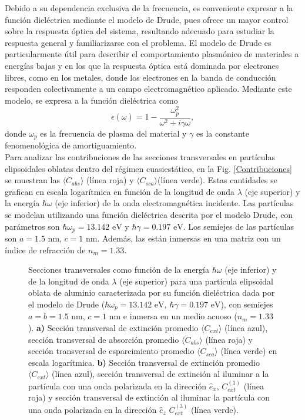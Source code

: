 Debido a su dependencia exclusiva de la frecuencia, es conveniente expresar a la función dieléctrica mediante el modelo de Drude, pues ofrece un mayor control sobre la respuesta óptica del sistema, resultando adecuado para estudiar la respuesta general y familiarizarse con el problema. El modelo de Drude es particularmente útil para describir el comportamiento plasmónico de materiales a energías bajas y en los que la respuesta óptica está dominada por electrones libres, como en los metales, donde los electrones en la banda de conducción responden colectivamente a un campo electromagnético aplicado. Mediante este modelo, se expresa a la función dieléctrica como \cite{Plasmonics}
\begin{equation} \epsilon(\omega) = 1 - \frac{\omega_p^2}{\omega^2 + i\gamma\omega}, \end{equation}
donde $\omega_p$ es la frecuencia de plasma del material y $\gamma$ es la constante fenomenológica de amortiguamiento. \\

Para analizar las contribuciones de las secciones transversales en partículas elipsoidales oblatas dentro del régimen cuasiestático, en la Fig. \ref{Contribuciones} se muestran las $\langle C_{abs} \rangle$ (línea roja) y $\langle C_{sca} \rangle$(línea verde). Estas cantidades se grafican en escala logarítmica en función de la longitud de onda $\lambda$ (eje superior) y la energía $\hbar\omega$ (eje inferior) de la onda electromagnética incidente. Las partículas se modelan utilizando una función dieléctrica descrita por el modelo Drude, con parámetros son $\hbar\omega_p=13.142\text{ eV}$ y $\hbar\gamma=0.197\text{ eV}$. Los semiejes de las partículas son $a=1.5\text{ nm}$, $c=1\text{ nm}$. Además, las están inmersas en una matriz con un índice de refracción de $n_m=1.33$. \\
\begin{figure}[h!]
	\quad%
	\caption{Secciones transversales como función de la energía $\hbar\omega$ (eje inferior) y de la longitud de onda $\lambda$ (eje superior) para una partícula elipsoidal oblata de aluminio caracterizada por su función dieléctrica dada por el modelo de Drude ($\hbar\omega_p=13.142\text{ eV}$, $\hbar\gamma=0.197\text{ eV}$), con semiejes $a=b=1.5\text{ nm}$, $c=1\text{ nm}$ e inmersa en un medio acuoso ($n_m=1.33$). \textbf{a)}  Sección transversal de extinción promedio $\langle C_{ext}\rangle$  (línea azul), sección transversal de absorción promedio $\langle C_{abs}\rangle$  (línea roja) y sección transversal de esparcimiento promedio $\langle C_{sca}\rangle$  (línea verde) en escala logarítmica. \textbf{b)} Sección transversal de extinción promedio $\langle C_{ext}\rangle$ (línea azul), sección transversal de extinción al iluminar a la partícula con una onda polarizada en la dirección $\hat{e}_x$, $C_{ext}^{(1)}$  (línea roja)  y sección transversal de extinción al iluminar la partícula con una onda polarizada en la dirección $\hat{e}_z$ $C_{ext}^{(3)}$  (línea verde).} \label{fig:test}
\end{figure}

